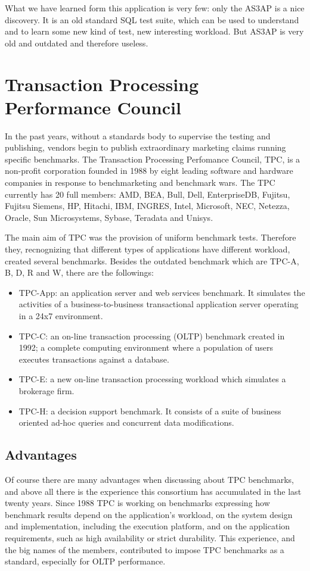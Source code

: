 What we have learned form this application is very few: only the AS3AP is a nice discovery. It is an old standard SQL test suite, which can be used to understand and to learn some new kind of test, new interesting workload. But AS3AP is very old and outdated and therefore useless.
	
	\section{Transaction Processing Performance Council}
In the past years, without a standards body to supervise the testing and publishing, vendors begin to publish extraordinary marketing claims running specific benchmarks. The Transaction Processing Perfomance Council, TPC, is a non-profit corporation founded in 1988 by eight leading software and hardware companies in response to benchmarketing and benchmark wars. The TPC currently has 20 full members: AMD, BEA, Bull, Dell, EnterpriseDB, Fujitsu, Fujitsu Siemens, HP, Hitachi, IBM, INGRES, Intel, Microsoft, NEC, Netezza, Oracle, Sun Microsystems, Sybase, Teradata and Unisys.

The main aim of TPC was the provision of uniform benchmark tests. Therefore they, recnognizing that different types of applications have different workload, created several benchmarks. Besides the outdated benchmark which are TPC-A, B, D, R and W, there are the followings: 
\begin{itemize}
	\item TPC-App: an application server and web services benchmark. It simulates the activities of a business-to-business transactional application server operating in a 24x7 environment.
	\item TPC-C: an on-line transaction processing (OLTP) benchmark created in 1992; a complete computing environment where a population of users executes transactions against a database.
	\item TPC-E: a new on-line transaction processing workload which simulates a brokerage firm.
	\item TPC-H: a decision support benchmark. It consists of a suite of business oriented ad-hoc queries and concurrent data modifications.
\end{itemize}

		\subsection{Advantages}
Of course there are many advantages when discussing about TPC benchmarks, and above all there is the experience this consortium has accumulated in the last twenty years. Since 1988 TPC is working on benchmarks expressing how benchmark results depend on the application's workload, on the system design and implementation, including the execution platform, and on the application requirements, such as high availability or strict durability. This experience, and the big names of the members, contributed to impose TPC benchmarks as a standard, especially for OLTP performance.

